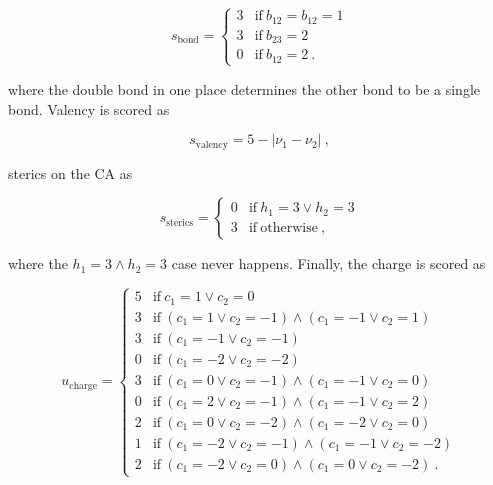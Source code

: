 \begin{equation}
	s_{\textrm{bond}} = 
	\begin{cases}
	3	&	\mathrm{if}~ b_{12} = b_{12} = 1 \\
	3	&	\mathrm{if}~ b_{23} = 2 \\
	0	&	\mathrm{if}~ b_{12} = 2 ~.
	\end{cases}
\end{equation}

where the double bond in one place determines the other bond to be a single bond. Valency is scored as

\begin{equation}
	s_{\textrm{valency}} = 5 - |\nu_1 - \nu_2| ~,
\end{equation}

sterics on the CA as

\begin{equation}
	s_{\textrm{sterics}} = 
	\begin{cases}
	0	&	\mathrm{if}~ h_1 = 3 \vee h_2 = 3 \\
	3	&	\mathrm{if}~ \textrm{otherwise} ~,
	\end{cases}
\end{equation}

where the $ h_1 = 3 \wedge h_2 = 3 $ case never happens. Finally, the charge is scored as

\begin{equation}
u_{\textrm{charge}} = 
\begin{cases}
5	&	\mathrm{if}~ c_1 = 1 \vee c_2 = 0 \\
3	&	\mathrm{if}~ (c_1 = 1 \vee c_2 = -1) \wedge (c_1 = -1 \vee c_2 = 1) \\
3   &	\mathrm{if}~ (c_1 = -1 \vee c_2 = -1) \\
0   &	\mathrm{if}~ (c_1 = -2 \vee c_2 = -2) \\
3   &	\mathrm{if}~ (c_1 = 0 \vee c_2 = -1) \wedge (c_1 = -1 \vee c_2 = 0) \\
0   &	\mathrm{if}~ (c_1 = 2 \vee c_2 = -1) \wedge (c_1 = -1 \vee c_2 = 2) \\
2   &	\mathrm{if}~ (c_1 = 0 \vee c_2 = -2) \wedge (c_1 = -2 \vee c_2 = 0) \\
1   &	\mathrm{if}~ (c_1 = -2 \vee c_2 = -1) \wedge (c_1 = -1 \vee c_2 = -2) \\
2   &	\mathrm{if}~ (c_1 = -2 \vee c_2 = 0) \wedge (c_1 = 0 \vee c_2 = -2) ~.
\end{cases}
\end{equation}

